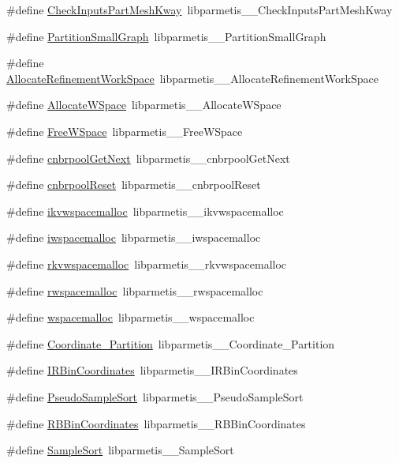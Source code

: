 \begin{DoxyCompactItemize}
\item 
\#define \hyperlink{a00960_a71de2d8a4bb106446d57c2fa64dbd340}{Check\+Inputs\+Part\+Mesh\+Kway}~libparmetis\+\_\+\+\_\+\+Check\+Inputs\+Part\+Mesh\+Kway
\item 
\#define \hyperlink{a00960_ad51acef56829404e71cd3e65ab94aa8c}{Partition\+Small\+Graph}~libparmetis\+\_\+\+\_\+\+Partition\+Small\+Graph
\item 
\#define \hyperlink{a00960_aef45ce1f26b8f23a237ccd0cd0cf0882}{Allocate\+Refinement\+Work\+Space}~libparmetis\+\_\+\+\_\+\+Allocate\+Refinement\+Work\+Space
\item 
\#define \hyperlink{a00960_a07400f3c84acb5609357ca92c4f5fb43}{Allocate\+W\+Space}~libparmetis\+\_\+\+\_\+\+Allocate\+W\+Space
\item 
\#define \hyperlink{a00960_a211a3aa477bacc440b870ae06a09f758}{Free\+W\+Space}~libparmetis\+\_\+\+\_\+\+Free\+W\+Space
\item 
\#define \hyperlink{a00960_ab59551593bb88c609b363f01e1cc065c}{cnbrpool\+Get\+Next}~libparmetis\+\_\+\+\_\+cnbrpool\+Get\+Next
\item 
\#define \hyperlink{a00960_af7a5a795e87cab732936fa2e05101d37}{cnbrpool\+Reset}~libparmetis\+\_\+\+\_\+cnbrpool\+Reset
\item 
\#define \hyperlink{a00960_ab5ec3bf63a1d1059352ad5edf53fbcb4}{ikvwspacemalloc}~libparmetis\+\_\+\+\_\+ikvwspacemalloc
\item 
\#define \hyperlink{a00960_a9e5789360afa3a6a7b99bf5885a078e4}{iwspacemalloc}~libparmetis\+\_\+\+\_\+iwspacemalloc
\item 
\#define \hyperlink{a00960_a3090ff98bb3e1df4181c205ebef8edce}{rkvwspacemalloc}~libparmetis\+\_\+\+\_\+rkvwspacemalloc
\item 
\#define \hyperlink{a00960_aedb45cb38d835692482d6ad7456e3884}{rwspacemalloc}~libparmetis\+\_\+\+\_\+rwspacemalloc
\item 
\#define \hyperlink{a00960_a16d147e03401f232c59d1d47e2ce6695}{wspacemalloc}~libparmetis\+\_\+\+\_\+wspacemalloc
\item 
\#define \hyperlink{a00960_a78bb5dfb703ddec01c99678cfa4236cb}{Coordinate\+\_\+\+Partition}~libparmetis\+\_\+\+\_\+\+Coordinate\+\_\+\+Partition
\item 
\#define \hyperlink{a00960_ad25e04d0a90e53840eebcd087a112d71}{I\+R\+Bin\+Coordinates}~libparmetis\+\_\+\+\_\+\+I\+R\+Bin\+Coordinates
\item 
\#define \hyperlink{a00960_aacd23a68bab71ccb1b5d7a6090af522f}{Pseudo\+Sample\+Sort}~libparmetis\+\_\+\+\_\+\+Pseudo\+Sample\+Sort
\item 
\#define \hyperlink{a00960_a5aea945ce3ff136410d414f2f3f81b01}{R\+B\+Bin\+Coordinates}~libparmetis\+\_\+\+\_\+\+R\+B\+Bin\+Coordinates
\item 
\#define \hyperlink{a00960_a003643773b3520f063be0e926f3a9a1a}{Sample\+Sort}~libparmetis\+\_\+\+\_\+\+Sample\+Sort
\end{DoxyCompactItemize}


